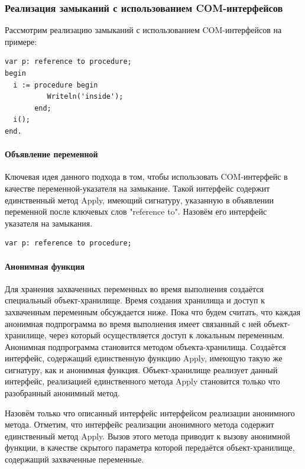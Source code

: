 \documentclass{imcs}
\begin{document}
\subsubsection{Реализация замыканий с использованием COM-интерфейсов}

Рассмотрим реализацию замыканий с использованием COM-интерфейсов на примере:

\begin{lstlisting}
var p: reference to procedure;
begin
  i := procedure begin
          Writeln('inside');
       end;
  i();
end.
\end{lstlisting}

\paragraph{Объявление переменной}

Ключевая идея данного подхода в том, чтобы использовать COM-интерфейс в качестве переменной-указателя
на замыкание. Такой интерфейс содержит единственный метод Apply, имеющий сигнатуру, указанную
в объявлении переменной после ключевых слов "reference to". Назовём его интерфейс указателя на
замыкания.

\begin{lstlisting}
var p: reference to procedure;
\end{lstlisting}

\paragraph{Анонимная функция}

Для хранения захваченных переменных во время выполнения
создаётся специальный объект-хранилище. Время создания хранилища
и доступ к захваченным переменным обсуждается ниже. Пока что будем считать, что каждая анонимная
подпрограмма во время выполнения имеет связанный с ней объект-хранилище, через
который осуществляется доступ к локальным переменным.
Анонимная подпрограмма становится методом объекта-хранилища. Создаётся интерфейс, содержащий
единственную функцию Apply, имеющую такую же сигнатуру, как и анонимная функция. Объект-хранилище
реализует данный интерфейс, реализацией единственного метода Apply становится только что
разобранный анонимный метод.

Назовём только что описанный интерфейс интерфейсом реализации анонимного метода. Отметим, что
интерфейс реализации анонимного метода содержит единственный метод Apply. Вызов этого метода
приводит к вызову анонимной функции, в качестве скрытого параметра которой
передаётся объект-хранилище, содержащий захваченные переменные.
\end{document}
